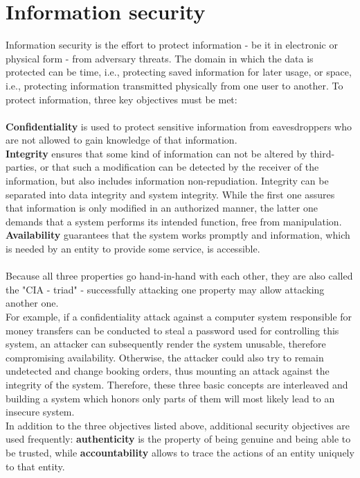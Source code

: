 \label{chap2}
\section{Information security}

Information security is the effort to protect information - be it in electronic or physical form - from adversary threats. 
The domain in which the data is protected can be time, i.e., protecting saved information for later usage, or space, i.e., protecting information
transmitted physically from one user to another. To protect information, three key objectives must be met:
\\
\\
\textbf{Confidentiality} is used to protect sensitive information from eavesdroppers who are not allowed to gain knowledge of that information.
\\
\textbf{Integrity} ensures that some kind of information can not be altered by third-parties, or that such a modification can be detected by the
receiver of the information, but also includes information non-repudiation. Integrity can be separated into data integrity and system integrity. While the first one assures
that information is only modified in an authorized manner, the latter one demands that a system performs its intended function, free from manipulation.
\\
\textbf{Availability} guarantees that the system works promptly and information, which is needed by an entity to provide some service, is accessible.
\\
\\
Because all three properties go hand-in-hand with each other, they are also called the "CIA - triad" \cite{stallings} - successfully attacking one property may allow attacking
another one. 
\\
For example, if a
confidentiality attack against a computer system responsible for money transfers can be conducted to steal a password used for controlling this system,
an attacker
can subsequently render the system unusable, therefore compromising availability. Otherwise, the attacker could also try to remain undetected and change
booking orders, thus mounting an attack against the integrity of the system. Therefore, these three basic concepts are interleaved and building a system which honors
only parts of them will most likely lead to an insecure system.
\\
In addition to the three objectives listed above, additional security objectives are used frequently: \textbf{authenticity} is the property of being genuine and being able to be 
trusted, while \textbf{accountability} allows to trace the actions of an entity uniquely to that entity.
